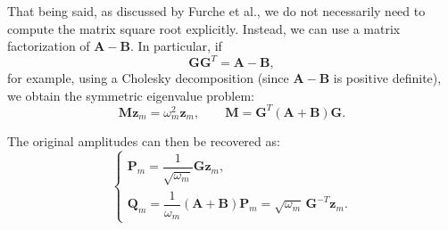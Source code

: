 \documentclass[10pt,aspectratio=169]{beamer}
\begin{document}
\begin{frame}
	That being said, as discussed by Furche et al., we do not necessarily need to compute the matrix square root explicitly.
	Instead, we can use a matrix factorization of $\mathbf A-\mathbf B$. In particular, if
	\begin{equation*}
		\mathbf G\mathbf G^T=\mathbf A-\mathbf B,
	\end{equation*}
	for example, using a Cholesky decomposition (since $\mathbf A -\mathbf B$ is positive definite), we obtain the symmetric eigenvalue problem:
	\begin{equation*}
		\boxed{\mathbf M\mathbf z_m=\omega_m^2\mathbf z_m,\qquad
			\mathbf M=\mathbf G^T(\mathbf A+\mathbf B)\mathbf G.}
	\end{equation*}
	
	\medskip
	The original amplitudes can then be recovered as:
	\begin{equation*}
		\begin{cases}
			\mathbf P_m=\dfrac{1}{\sqrt{\omega_m}}\mathbf G\mathbf z_m,\\
			\mathbf Q_m=\dfrac{1}{\omega_m}(\mathbf A+\mathbf B)\mathbf P_m = \sqrt{\omega_m}\,\mathbf G^{-T}\mathbf z_m.
		\end{cases}
	\end{equation*}
\end{frame}
\end{document}
